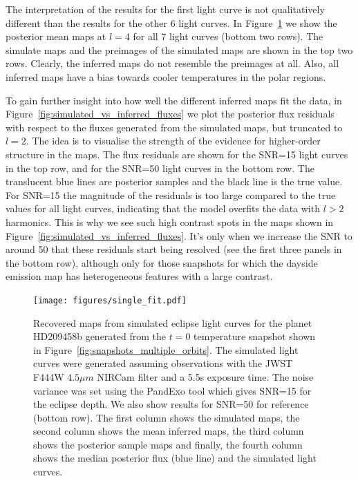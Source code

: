 \documentclass[12pt,dvipsnames]{report}
\begin{document}
The interpretation of the results for the first light curve is not qualitatively different 
than the results for the other 6 light curves. In Figure~\ref{fig:single_fit} we show the 
posterior mean maps at $l=4$ for all 7 light curves (bottom two rows).
The simulate maps and the preimages of the simulated maps are shown in the top two rows. 
Clearly, the inferred maps do not resemble the preimages at all. Also, all inferred maps
have a bias towards cooler temperatures in the polar regions. 

To gain further insight into how well the different inferred maps fit the data, in 
Figure~\ref{fig:simulated_vs_inferred_fluxes} we plot the posterior 
flux residuals with respect to the fluxes generated from the simulated maps, but truncated 
to $l=2$. 
The idea is to visualise the strength of the evidence for higher-order
structure in the maps. The flux residuals are shown for the SNR=15 light curves in the top row,
and for the SNR=50 light curves in the bottom row. The translucent blue lines are posterior 
samples and the black line is the true value. For SNR=15 the magnitude of the residuals is 
too large compared to the true values for all light curves, indicating that the model overfits 
the data with $l>2$ harmonics. This is why we see such high contrast spots in the maps shown 
in Figure~\ref{fig:simulated_vs_inferred_fluxes}. It's only when we increase the SNR to around 
50 that these residuals start being resolved (see the first three panels in the bottom row), 
although only for those snapshots for which the dayside emission map has heterogeneous features with 
a large contrast.

\begin{figure}[t!]
    \begin{centering}
        \texttt{[image: figures/single\_fit.pdf]}
        \caption{
            Recovered maps from simulated eclipse light curves for the planet HD209458b
            generated from the $t=0$ temperature snapshot shown in 
            Figure~\ref{fig:snapshots_multiple_orbits}.
            The simulated light curves were generated assuming observations with 
            the JWST F444W $4.5\mu m$ NIRCam filter and a 5.5s exposure time. The noise 
            variance was set using the PandExo tool which gives SNR=15 for the eclipse depth.
            We also show results for SNR=50 for reference (bottom row).
            The first column shows the simulated maps, the second column shows the mean 
            inferred maps, the third column shows the posterior sample maps and finally,
            the fourth column shows the median posterior flux (blue line) and the simulated
            light curves.
        }
        \label{fig:single_fit}
    \end{centering}
\end{figure}
\end{document}
